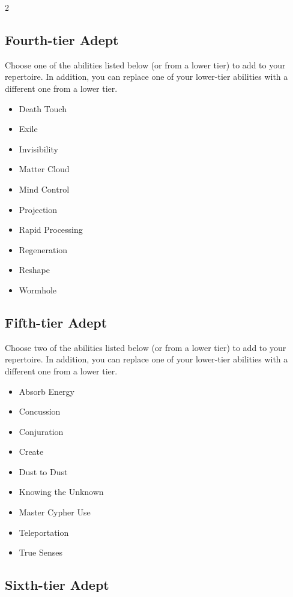 \begin{multicols}{2}
\subsection{Fourth-tier Adept}

Choose one of the abilities listed below (or from a lower tier) to add to your repertoire. In addition, you can replace one of your lower-tier abilities with a different one from a lower tier.

\begin{itemize}
\item Death Touch
\item Exile
\item Invisibility
\item Matter Cloud
\item Mind Control
\item Projection
\item Rapid Processing 
\item Regeneration
\item Reshape
\item Wormhole
\end{itemize}

\subsection{Fifth-tier Adept}

Choose two of the abilities listed below (or from a lower tier) to add to your repertoire. In addition, you can replace one of your lower-tier abilities with a different one from a lower tier.

\begin{itemize}
\item Absorb Energy
\item Concussion
\item Conjuration
\item Create
\item Dust to Dust 
\item Knowing the Unknown
\item Master Cypher Use
\item Teleportation
\item True Senses
\end{itemize}

\subsection{Sixth-tier Adept}


\end{multicols}
